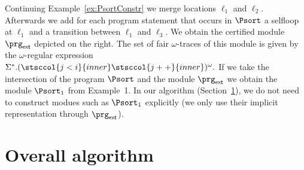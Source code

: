 
\begin{example}
Continuing Example~\ref{ex:PsortConstr} we merge locations $\ell_1$ and $\ell_2$.
Afterwards we add for each program statement that occurs in $\Psort$ a selfloop at $\ell_1$ and a transition between $\ell_1$ and $\ell_3$.
We obtain the certified module $\prg_\mathsf{ext}$ depicted on the right.
The set of fair $\omega$-traces of this module is given by the $\omega$-regular expression $\Sigma^*.(\stsccol{j<i}{inner}\stsccol{j++}{inner})^\omega.$
If we take the intersection of the program $\Psort$ and the module $\prg_\mathsf{ext}$ 
we obtain the module $\Psort_1$ from Example~1.  
In our algorithm (Section~\ref{sec:automatic-decomposition}), we do not need to construct modues such as $\Psort_1$ explicitly (we only use their implicit representation through $\prg_\mathsf{ext}$).
\end{example}














\section{Overall algorithm}
\label{sec:automatic-decomposition}

